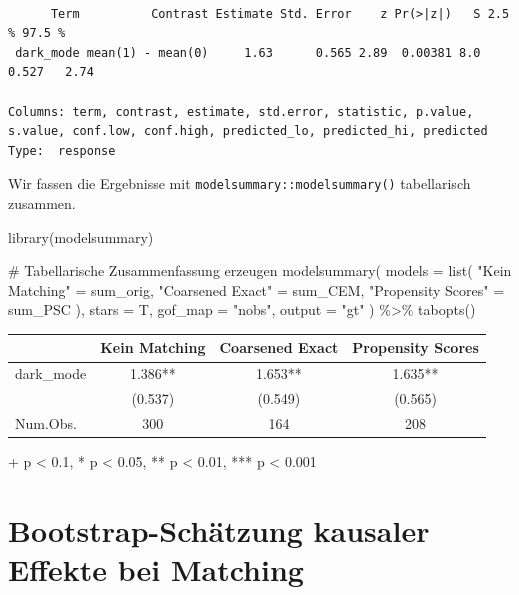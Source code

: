 \documentclass[
  a4paper,
  DIV=11,
  oneside]{scrreprt}
\newenvironment{Shaded}{\begin{snugshade}}{\end{snugshade}}
\newcommand{\AttributeTok}[1]{\textcolor[rgb]{0.40,0.45,0.13}{#1}}
\newcommand{\CommentTok}[1]{\textcolor[rgb]{0.37,0.37,0.37}{#1}}
\newcommand{\FunctionTok}[1]{\textcolor[rgb]{0.28,0.35,0.67}{#1}}
\newcommand{\NormalTok}[1]{\textcolor[rgb]{0.00,0.23,0.31}{#1}}
\newcommand{\OtherTok}[1]{\textcolor[rgb]{0.00,0.23,0.31}{#1}}
\newcommand{\SpecialCharTok}[1]{\textcolor[rgb]{0.37,0.37,0.37}{#1}}
\newcommand{\StringTok}[1]{\textcolor[rgb]{0.13,0.47,0.30}{#1}}
\begin{document}
\begin{verbatim}

      Term          Contrast Estimate Std. Error    z Pr(>|z|)   S 2.5 % 97.5 %
 dark_mode mean(1) - mean(0)     1.63      0.565 2.89  0.00381 8.0 0.527   2.74

Columns: term, contrast, estimate, std.error, statistic, p.value, s.value, conf.low, conf.high, predicted_lo, predicted_hi, predicted 
Type:  response 
\end{verbatim}

Wir fassen die Ergebnisse mit \texttt{modelsummary::modelsummary()}
tabellarisch zusammen.

\begin{Shaded}
\begin{Highlighting}[]
\FunctionTok{library}\NormalTok{(modelsummary)}

\CommentTok{\# Tabellarische Zusammenfassung erzeugen}
\FunctionTok{modelsummary}\NormalTok{(}
  \AttributeTok{models =} \FunctionTok{list}\NormalTok{(}
   \StringTok{"Kein Matching"} \OtherTok{=}\NormalTok{ sum\_orig, }
   \StringTok{"Coarsened Exact"} \OtherTok{=}\NormalTok{ sum\_CEM, }
   \StringTok{"Propensity Scores"} \OtherTok{=}\NormalTok{ sum\_PSC}
\NormalTok{  ),}
  \AttributeTok{stars =}\NormalTok{ T, }
  \AttributeTok{gof\_map =} \StringTok{"nobs"}\NormalTok{, }
  \AttributeTok{output =} \StringTok{"gt"}
\NormalTok{) }\SpecialCharTok{\%\textgreater{}\%}
  \FunctionTok{tabopts}\NormalTok{()}
\end{Highlighting}
\end{Shaded}

\setlength{\LTpost}{0mm}
\begin{longtable*}{lccc}
\toprule
  & Kein Matching & Coarsened Exact & Propensity Scores \\ 
\midrule\addlinespace[2.5pt]
dark\_mode & 1.386** & 1.653** & 1.635** \\ 
 & (0.537) & (0.549) & (0.565) \\ 
Num.Obs. & 300 & 164 & 208 \\ 
\bottomrule
\end{longtable*}
\begin{minipage}{\linewidth}
+ p < 0.1, * p < 0.05, ** p < 0.01, *** p < 0.001\\
\end{minipage}

\section{Bootstrap-Schätzung kausaler Effekte bei
Matching}\label{sec-bootmatching}
\end{document}
